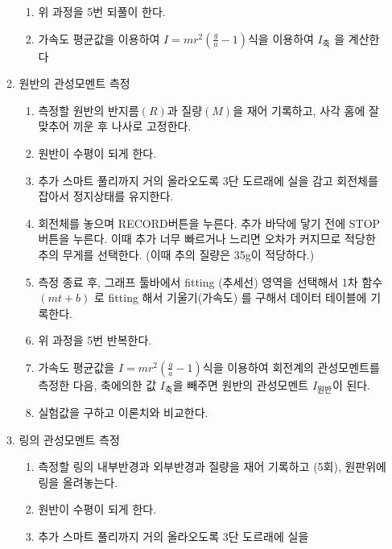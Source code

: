 \documentclass[12pt,a4paper]{article}
\begin{document}
\begin{enumerate}
\begin{enumerate}
\begin{enumerate}
                    \item 위 과정을 5번 되풀이 한다.
                    \item 가속도 평균값을 이용하여 $I = mr^2(\frac{g}{a}-1)$식을
                        이용하여 $I_{\textrm{축}}$ 을 계산한다
                \end{enumerate}
            \item 원반의 관성모멘트 측정
                \begin{enumerate}
                    \item 측정할 원반의 반지름$(R)$과 질량$(M)$을 재어 기록하고,
                        사각 홈에 잘 맞추어 끼운 후 나사로 고정한다.
                    \item 원반이 수평이 되게 한다.
                    \item 추가 스마트 풀리까지 거의 올라오도록 3단 도르래에 실을
                        감고 회전체를 잡아서 정지상태를 유지한다.
                    \item 회전체를 놓으며 RECORD버튼을 누른다. 추가 바닥에 닿기
                        전에 STOP 버튼을 누른다. 이때 추가 너무 빠르거나 느리면
                        오차가 커지므로 적당한 추의 무게를 선택한다.
                        (이때 추의 질량은 35g이 적당하다.)
                    \item 측정 종료 후, 그래프 툴바에서 fitting (추세선) 영역을
                        선택해서 1차 함수 $(mt+b)$ 로 fitting 해서 기울기(가속도)
                        를 구해서 데이터 테이블에 기록한다.
                    \item 위 과정을 5번 반복한다.
                    \item 가속도 평균값을 $I = mr^2(\frac{g}{a}-1)$식을 이용하여
                        회전계의 관성모멘트를 측정한 다음, 축에의한 값
                        $I_{\textrm{축}}$을 빼주면 원반의 관성모멘트
                        $I_{\textrm{원반}}$이 된다.
                    \item 실험값을 구하고 이론치와 비교한다.
                \end{enumerate}
            \item 링의 관성모멘트 측정
                \begin{enumerate}
                    \item 측정할 링의 내부반경과 외부반경과 질량을 재어 기록하고
                        (5회), 원판위에 링을 올려놓는다.
                    \item 원반이 수평이 되게 한다.
                    \item 추가 스마트 풀리까지 거의 올라오도록 3단 도르래에 실을

\end{enumerate}
\end{enumerate}
\end{enumerate}
\end{document}
